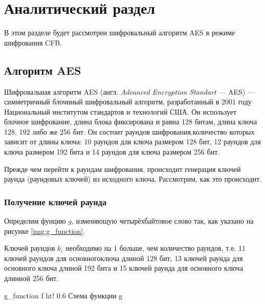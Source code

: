 \chapter{Аналитический раздел}

В этом разделе будет рассмотрен шифровальный алгоритм AES в режиме шифрования CFB.

\section{Алгоритм AES}

Шифровальная алгоритм AES (англ. \textit{Advanced Encryption Standart} --- AES) --- симметричный блочнный шифровальный алгоритм, разработанный в 2001 году Национальный институтом стандартов и технологий США. Он использует блочное шифрование, длина блока фиксирована и равна 128 битам, длина ключа 128, 192 либо же 256 бит. Он состоит раундов шифрования,количество которых зависит от длины ключа: 10 раундов для ключа размером 128 бит, 12 раундов для ключа размером 192 бита и 14 раундов для ключа размером 256 бит.

Прежде чем перейти к раундам шифрования, происходит генерация ключей раунда (раундовых ключей) из исходного ключа, Рассмотрим, как это происходит.

\subsection{Получение ключей раунда}

Определим фунцию $g$, изменяющую четырёхбайтовое слово так, как указано на рисунке \ref{img:g_function}.

Ключей раундов $k_{i}$ необходимо на 1 больше, чем количество раундов, т.е. 11 ключей раундов для основногоключа длиной 128 бит, 13 ключей раунда для основного ключа длиной 192 бита и 15 ключей раунда для основного ключа длинной 256 бит.

\clearpage

{g_function} %
{f} %
{ht!} %
{0.6\textwidth} %
{Схема функции g} %


